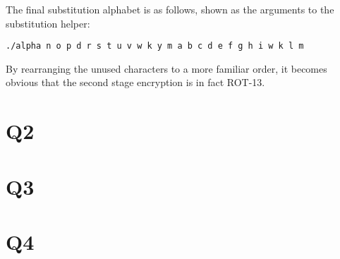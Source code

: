 \documentclass[pdflatex, a4paper,12pt]{article}
\begin{document}
\begin{quote}
    
\end{quote}

The final substitution alphabet is as follows, shown as the arguments to the
substitution helper:

\begin{verbatim}
./alpha n o p d r s t u v w k y m a b c d e f g h i w k l m
\end{verbatim}
By rearranging the unused characters to a more familiar order, it becomes
obvious that the second stage encryption is in fact ROT-13.

\section{Q2}
\section{Q3}
\section{Q4}
\end{document}
